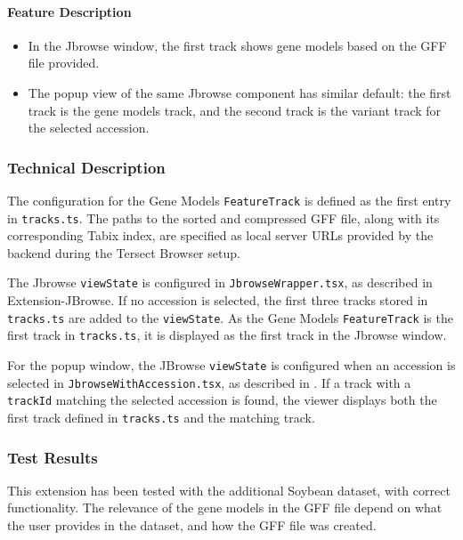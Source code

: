 \documentclass[12pt]{article}
\begin{document}
\paragraph{Feature Description}
\begin{itemize}
    \item In the Jbrowse window, the first track shows gene models based on the GFF file provided.  
    \item The popup view of the same Jbrowse component has similar default: the first track is the gene models track, and the second track is the variant track for the selected accession.
\end{itemize}

\subsubsection{Technical Description}
The configuration for the Gene Models \verb+FeatureTrack+ is defined as the first entry in \verb+tracks.ts+. The paths to the sorted and compressed GFF file, along with its corresponding Tabix index, are specified as local server URLs provided by the backend during the Tersect Browser setup. 

The Jbrowse \verb+viewState+ is configured in \verb+JbrowseWrapper.tsx+, as described in Extension-JBrowse. If no accession is selected, the first three tracks stored in \verb+tracks.ts+ are added to the \verb+viewState+. As the Gene Models \verb+FeatureTrack+ is the first track in \verb+tracks.ts+, it is displayed as the first track in the Jbrowse window. 

For the popup window, the JBrowse \verb+viewState+ is configured when an accession is selected in \verb+JbrowseWithAccession.tsx+, as described in . If a track with a \verb+trackId+ matching the selected accession is found, the viewer displays both the first track defined in \verb+tracks.ts+ and the matching track. 

\subsubsection{Test Results}
This extension has been tested with the additional Soybean dataset, with correct functionality. The relevance of the gene models in the GFF file depend on what the user provides in the dataset, and how the GFF file was created. 
\end{document}
